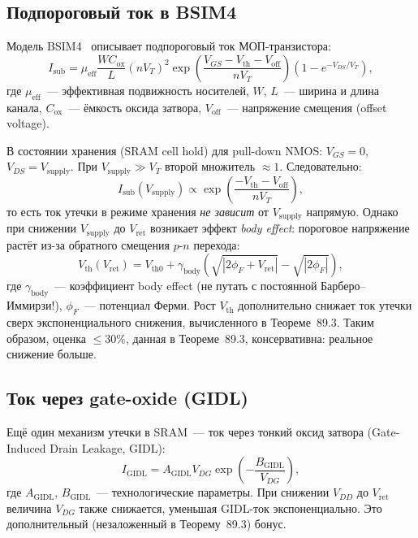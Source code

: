 \subsection{Подпороговый ток в BSIM4}

Модель BSIM4~\cite{BSIM4-Manual} описывает подпороговый ток МОП-транзистора:
%
\begin{equation}
  I_\mathrm{sub} = \mu_\mathrm{eff} \frac{W C_\mathrm{ox}}{L} (nV_T)^2
    \exp\!\left(\frac{V_{GS} - V_\mathrm{th} - V_\mathrm{off}}{n V_T}\right)
    \left(1 - e^{-V_{DS}/V_T}\right),
  \label{eq:bsim4-sub}
\end{equation}
%
где $\mu_\mathrm{eff}$~--- эффективная подвижность носителей,
$W$, $L$~--- ширина и длина канала,
$C_\mathrm{ox}$~--- ёмкость оксида затвора,
$V_\mathrm{off}$~--- напряжение смещения (offset voltage).

В состоянии хранения (SRAM cell hold) для pull-down NMOS:
$V_{GS} = 0$, $V_{DS} = V_\mathrm{supply}$.
При $V_\mathrm{supply} \gg V_T$ второй множитель $\approx 1$.
Следовательно:
%
\begin{equation}
  I_\mathrm{sub}(V_\mathrm{supply}) \propto \exp\!\left(\frac{-V_\mathrm{th} - V_\mathrm{off}}{n V_T}\right),
  \label{eq:bsim4-hold}
\end{equation}
%
то есть ток утечки в режиме хранения \emph{не зависит} от $V_\mathrm{supply}$
напрямую.
Однако при снижении $V_\mathrm{supply}$ до $V_\mathrm{ret}$
возникает эффект \emph{body effect}: пороговое напряжение
растёт из-за обратного смещения $p$-$n$ перехода:
%
\begin{equation}
  V_\mathrm{th}(V_\mathrm{ret}) = V_\mathrm{th0} + \gamma_\mathrm{body}
    \left(\sqrt{|2\phi_F + V_\mathrm{ret}|} - \sqrt{|2\phi_F|}\right),
  \label{eq:body-effect}
\end{equation}
%
где $\gamma_\mathrm{body}$~--- коэффициент body effect
(не путать с постоянной Барберо--Иммирзи!),
$\phi_F$~--- потенциал Ферми.
Рост $V_\mathrm{th}$ дополнительно снижает ток утечки сверх
экспоненциального снижения, вычисленного в Теореме~89.3.
Таким образом, оценка $\leq 30\%$, данная в Теореме~89.3, консервативна:
реальное снижение больше.

\subsection{Ток через gate-oxide (GIDL)}

Ещё один механизм утечки в SRAM~--- ток через тонкий оксид затвора
(Gate-Induced Drain Leakage, GIDL):
%
\begin{equation}
  I_\mathrm{GIDL} = A_\mathrm{GIDL} V_{DG} \exp\!\left(-\frac{B_\mathrm{GIDL}}{V_{DG}}\right),
  \label{eq:gidl}
\end{equation}
%
где $A_\mathrm{GIDL}$, $B_\mathrm{GIDL}$~--- технологические параметры.
При снижении $V_{DD}$ до $V_\mathrm{ret}$ величина $V_{DG}$ также снижается,
уменьшая GIDL-ток экспоненциально.
Это дополнительный (незаложенный в Теорему~89.3) бонус.

